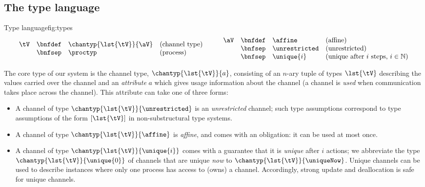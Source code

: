 \documentclass[copyright]{eptcs}
\begin{document}
\subsection{The type language}

\begin{display}{Type language}{fig:types}
\begin{equation*}
\begin{array}{lrll}
\tV & \bnfdef & \chantyp{\lst{\tV}}{\aV} & \text{(channel type)} \\
    & \bnfsep & \proctyp                 & \text{(process)} 
\end{array}\qquad 
\begin{array}{lrll}
\aV & \bnfdef & \affine       & \text{(affine)} \\
    & \bnfsep & \unrestricted & \text{(unrestricted)} \\
    & \bnfsep & \unique{i}    & \text{(unique after $i$ steps, $i \in \mathbb{N}$)}  
\end{array}
\end{equation*}
\end{display}

The core type of our system is the channel type, $\chantyp{\lst{\tV}}{a}$,
consisting of an $n$-ary tuple of types $\lst{\tV}$ describing the values carried
over the channel and an \emph{attribute} $a$ which gives usage information about the
channel (a channel is \textit{used} when communication takes place across the
channel). This attribute can take one of three forms:
\begin{itemize}
\item A channel of type $\chantyp{\lst{\tV}}{\unrestricted}$ is an
\textit{unrestricted} channel; such type assumptions correspond to type
assumptions of the form $[\lst{\tV}]$ in non-substructural type systems.
\item A channel of type $\chantyp{\lst{\tV}}{\affine}$ is \textit{affine}, and
comes with an obligation: it can be used at most once.
\item A channel of type $\chantyp{\lst{\tV}}{\unique{i}}$ comes with a
guarantee that it is \textit{unique} after $i$ actions; we
abbreviate the type  $\chantyp{\lst{\tV}}{\unique{0}}$ of channels that are
unique \textit{now} to $\chantyp{\lst{\tV}}{\uniqueNow}$. 
Unique channels can be used to describe instances where only one process has
access to  (owns) a channel. Accordingly, strong update and deallocation is
safe for unique channels.
\end{itemize}
\end{document}
